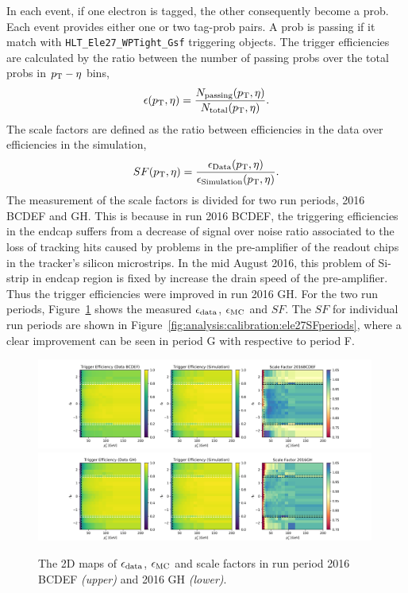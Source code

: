 In each event, if one electron is tagged, the other consequently become a prob. Each event provides either one or two tag-prob pairs. A prob is passing if it match with \texttt{HLT\_Ele27\_WPTight\_Gsf} triggering objects. The trigger efficiencies are calculated by the ratio between the number of passing probs over the total probs in $p_{\mathrm{T}}-\eta$ bins, 
\begin{equation*}
    \epsilon (p_{\mathrm{T}}, \eta) = \frac{ N_{\rm passing} (p_{\mathrm{T}}, \eta) } {  N_{\rm total} (p_{\mathrm{T}}, \eta) }.
\end{equation*}
\noindent The scale factors are defined as the ratio between efficiencies in the data over efficiencies in the simulation,
\begin{equation}
SF (p_{\mathrm{T}}, \eta) = \frac{\epsilon_{\rm{Data}} (p_{\mathrm{T}}, \eta) }{\epsilon_{\rm{Simulation}} (p_{\mathrm{T}}, \eta) }.
\end{equation}
\noindent The measurement of the scale factors is divided for two run periods, 2016 BCDEF and GH. This is because in run 2016 BCDEF,  the triggering efficiencies in the endcap suffers from a decrease of signal over noise ratio associated to the loss of tracking hits caused by problems in the pre-amplifier of the readout chips in the tracker's silicon microstrips. In the mid August 2016, this problem of Si-strip in endcap region is fixed by increase the drain speed of the pre-amplifier. Thus the trigger efficiencies were improved in run 2016 GH. For the two run periods, Figure~\ref{fig:analysis:calibration:ele27SF} shows the measured $\epsilon_{\rm{data}}$, $\epsilon_{\rm{MC}}$ and $SF$. The $SF$ for individual run periods are shown in Figure~\ref{fig:analysis:calibration:ele27SFperiods}, where a clear improvement can be seen in period G with respective to period F.
\begin{figure}
    \centering
    \includegraphics[width=0.99\textwidth]{chapters/Analysis/sectionCalibration/figures/eTrigger/eff2d_BCDEF.png}
    \includegraphics[width=0.99\textwidth]{chapters/Analysis/sectionCalibration/figures/eTrigger/eff2d_GH.png}
    \caption{The 2D maps of $\epsilon_{\rm{data}}$, $\epsilon_{\rm{MC}}$ and scale factors in run period 2016 BCDEF \emph{(upper)} and 2016 GH \emph{(lower)}.}
    \label{fig:analysis:calibration:ele27SF}
\end{figure}
